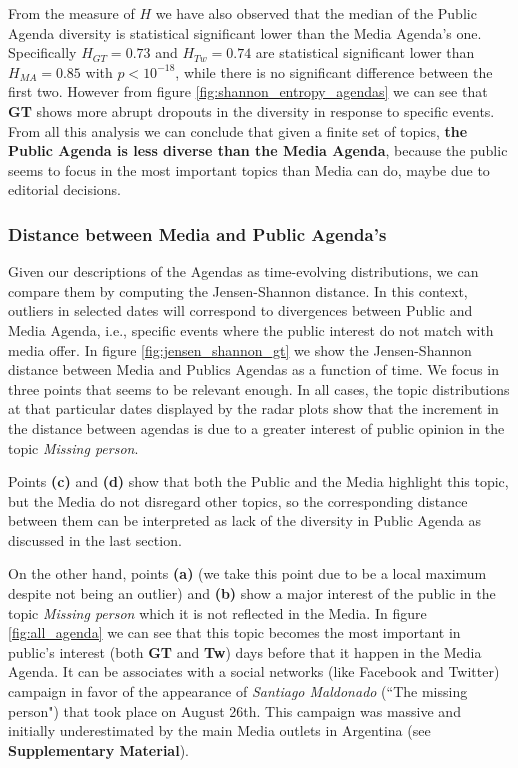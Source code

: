 \documentclass{bmcart}
\begin{document}
\par From the measure of $H$ we have also observed that the median of the Public Agenda diversity is statistical significant lower than the Media Agenda's one.
Specifically $H_{GT} = 0.73$ and $H_{Tw} = 0.74$ are statistical significant lower than $H_{MA} = 0.85$ with $p < 10^{-18}$, while there is no significant difference between the first two. 
However from figure \ref{fig:shannon_entropy_agendas} we can see that \textbf{GT} shows more abrupt dropouts in the diversity in response to specific events.
From all this analysis we  can conclude that given a finite set of topics, \textbf{the Public Agenda is less diverse than the Media Agenda}, because the public seems to focus in the most important topics than Media can do, maybe due to editorial decisions.

\subsubsection*{Distance between Media and Public Agenda's }

\par Given our descriptions of the Agendas as time-evolving distributions, we can  compare them by computing the Jensen-Shannon distance. In this context, outliers in selected dates will correspond to divergences between Public and Media Agenda, i.e., specific events where the public interest do not match with media offer.
In figure \ref{fig:jensen_shannon_gt} we show the Jensen-Shannon distance between Media and Publics Agendas as a function of time. We focus in three points that seems to be relevant enough. In all cases, the topic distributions at that particular dates displayed by  the radar plots show that the increment in the distance between agendas is due to a greater interest of public opinion in the topic \emph{Missing person}. 

\par Points \textbf{(c)} and \textbf{(d)} show that both the Public and the Media highlight this topic, but the Media do not disregard other topics, so the corresponding distance between them can be interpreted as lack of the diversity in Public Agenda as discussed in the last section.

\par On the other hand,  points \textbf{(a)} (we take this point due to be a local maximum despite not being an outlier) and \textbf{(b)}  show a major  interest of the public in the topic \emph{Missing person} which it is not reflected in the Media.  In figure \ref{fig:all_agenda} we can see that this topic becomes the most important in public's interest (both \textbf{GT} and \textbf{Tw}) days before that  it happen in the Media Agenda. It can be associates  with a social networks (like Facebook and Twitter) campaign  in favor  of the appearance of \emph{Santiago Maldonado} (``The missing person") that took place on  August 26th. This campaign was massive and  initially underestimated by the main Media outlets in Argentina (see \textbf{Supplementary Material}). 
\end{document}

